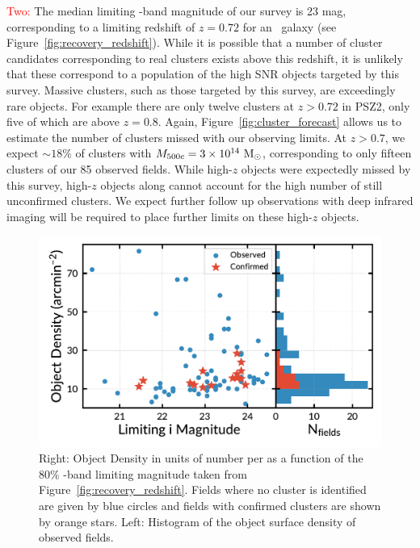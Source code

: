 \documentclass[apj, revtex4-1]{emulateapj}
\newcommand{\editorial}[1]{\textcolor{red}{#1}}
\begin{document}
\editorial{Two:} The median limiting \sdssi-band magnitude of our survey is 23 mag, corresponding to a limiting redshift of $z=0.72$ for an \mstar\ galaxy (see Figure~\ref{fig:recovery_redshift}). While it is possible that a number of cluster candidates corresponding to real clusters exists above this redshift, it is unlikely that these correspond to a population of the high SNR objects targeted by this survey. Massive clusters, such as those targeted by this survey, are exceedingly rare objects. For example there are only twelve clusters at $z>0.72$ in PSZ2, only five of which are above $z=0.8$. Again, Figure~\ref{fig:cluster_forecast} allows us to estimate the number of clusters missed with our observing limits. At $z>0.7$, we expect $\sim18\%$ of clusters with $M_{500c}=3\times10^{14}~\hbox{$\mathrm{M}_\odot$}$, corresponding to only fifteen clusters of our 85 observed fields. While high-$z$ objects were expectedly missed by this survey, high-$z$ objects along cannot account for the high number of still unconfirmed clusters. We expect further follow up observations with deep infrared imaging will be required to place further limits on these high-$z$ objects.

\begin{figure}
	\includegraphics[width=\columnwidth]{figures/N_vs_density.pdf}
	\caption{Right: Object Density in units of number per \arcminsq as a function of the 80\% \sdssi-band limiting magnitude taken from Figure~\ref{fig:recovery_redshift}. Fields where no cluster is identified are given by blue circles and fields with confirmed clusters are shown by orange stars. Left: Histogram of the object surface density of observed fields.}
	\label{fig:N_vs_density}
\end{figure}
\end{document}
